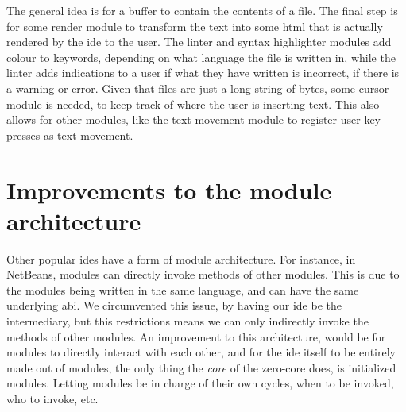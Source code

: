 The general idea is for a buffer to contain the contents of a file. The final
step is for some render module to transform the text into some \gls*{html} that
is actually rendered by the \gls*{ide} to the user. The linter and syntax
highlighter modules add colour to keywords, depending on what language the file
is written in, while the linter adds indications to a user if what they have
written is incorrect, if there is a warning or error. Given that files are just
a long string of bytes, some cursor module is needed, to keep track of where the
user is inserting text. This also allows for other modules, like the text
movement module to register user key presses as text movement.


\section{Improvements to the module architecture}

Other popular \gls*{ide}s have a form of module architecture. For instance, in
NetBeans, modules can directly invoke methods of other modules. This is due to
the modules being written in the same language, and can have the same underlying
\gls*{abi}. We circumvented this issue, by having our \gls*{ide} be the
intermediary, but this restrictions means we can only indirectly invoke the
methods of other modules. An improvement to this architecture, would be for
modules to directly interact with each other, and for the \gls*{ide} itself to be
entirely made out of modules, the only thing the \textit{core} of the zero-core
does, is initialized modules. Letting modules be in charge of their own cycles,
when to be invoked, who to invoke, etc.
